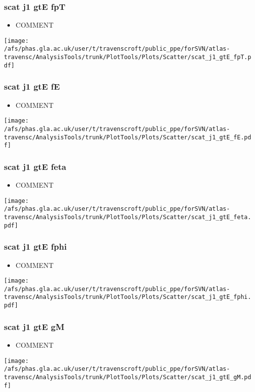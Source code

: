 \documentclass{beamer}
\begin{document}
\begin{frame}
\frametitle{scat j1 gtE fpT}
\begin{itemize}
\item COMMENT
\end{itemize}
\begin{center}
\texttt{[image: /afs/phas.gla.ac.uk/user/t/travenscroft/public\_ppe/forSVN/atlas-travensc/AnalysisTools/trunk/PlotTools/Plots/Scatter/scat\_j1\_gtE\_fpT.pdf]}
\end{center}
\end{frame}

\begin{frame}
\frametitle{scat j1 gtE fE}
\begin{itemize}
\item COMMENT
\end{itemize}
\begin{center}
\texttt{[image: /afs/phas.gla.ac.uk/user/t/travenscroft/public\_ppe/forSVN/atlas-travensc/AnalysisTools/trunk/PlotTools/Plots/Scatter/scat\_j1\_gtE\_fE.pdf]}
\end{center}
\end{frame}

\begin{frame}
\frametitle{scat j1 gtE feta}
\begin{itemize}
\item COMMENT
\end{itemize}
\begin{center}
\texttt{[image: /afs/phas.gla.ac.uk/user/t/travenscroft/public\_ppe/forSVN/atlas-travensc/AnalysisTools/trunk/PlotTools/Plots/Scatter/scat\_j1\_gtE\_feta.pdf]}
\end{center}
\end{frame}

\begin{frame}
\frametitle{scat j1 gtE fphi}
\begin{itemize}
\item COMMENT
\end{itemize}
\begin{center}
\texttt{[image: /afs/phas.gla.ac.uk/user/t/travenscroft/public\_ppe/forSVN/atlas-travensc/AnalysisTools/trunk/PlotTools/Plots/Scatter/scat\_j1\_gtE\_fphi.pdf]}
\end{center}
\end{frame}

\begin{frame}
\frametitle{scat j1 gtE gM}
\begin{itemize}
\item COMMENT
\end{itemize}
\begin{center}
\texttt{[image: /afs/phas.gla.ac.uk/user/t/travenscroft/public\_ppe/forSVN/atlas-travensc/AnalysisTools/trunk/PlotTools/Plots/Scatter/scat\_j1\_gtE\_gM.pdf]}
\end{center}
\end{frame}
\end{document}

